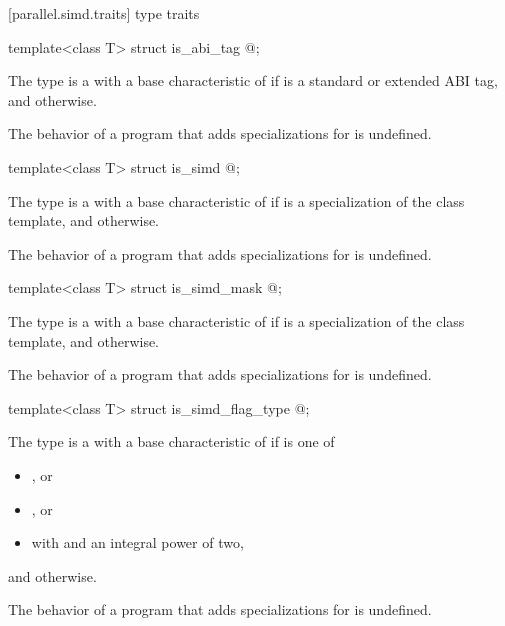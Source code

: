 [parallel.simd.traits]{ type traits}

\begin{itemdecl}
template<class T> struct is_abi_tag { @\seebelow@ };
\end{itemdecl}

\begin{itemdescr}
\pnum
The type  is a  with a base characteristic of  if  is a standard or extended ABI tag, and  otherwise.

\pnum
The behavior of a program that adds specializations for  is undefined.
\end{itemdescr}

\begin{itemdecl}
template<class T> struct is_simd { @\seebelow@ };
\end{itemdecl}

\begin{itemdescr}
\pnum
The type  is a  with a base characteristic of  if  is a specialization of the  class template, and  otherwise.

\pnum
The behavior of a program that adds specializations for  is undefined.
\end{itemdescr}

\begin{itemdecl}
template<class T> struct is_simd_mask { @\seebelow@ };
\end{itemdecl}

\begin{itemdescr}
\pnum
The type  is a  with a base characteristic of  if  is a specialization of the  class template, and  otherwise.

\pnum
The behavior of a program that adds specializations for  is undefined.
\end{itemdescr}

\begin{itemdecl}
template<class T> struct is_simd_flag_type { @\seebelow@ };
\end{itemdecl}

\begin{itemdescr}
\pnum
The type  is a  with a base characteristic of  if  is one of
\begin{itemize}
  \item {}, or
  \item {}, or
  \item {} with  and  an integral power of two,
\end{itemize}
and  otherwise.

\pnum
The behavior of a program that adds specializations for  is undefined.
\end{itemdescr}

